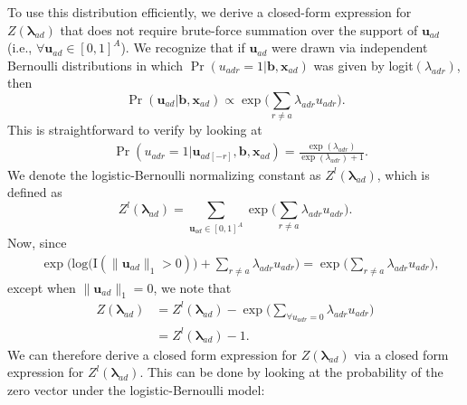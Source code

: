 \documentclass[ba]{imsart}
\numberwithin{equation}{section}
\theoremstyle{plain}
\begin{document}
	To use this distribution efficiently, we derive a closed-form expression for $Z(\boldsymbol{\lambda}_{ad})$ that does not require brute-force summation over the support of $\boldsymbol{u}_{ad}$ (i.e., $\forall \boldsymbol{u}_{ad} \in [0,1]^A$). We recognize that if $\boldsymbol{u}_{ad}$ were drawn via independent Bernoulli distributions in which $\Pr({u}_{adr}=1|\boldsymbol{b}, \boldsymbol{x}_{ad})$ was given by logit$(\lambda_{adr})$, then 
	\begin{equation*}
		\Pr(\boldsymbol{u}_{ad}|\boldsymbol{b}, \boldsymbol{x}_{ad}) \propto \exp\Big(\sum_{r \neq a } \lambda_{adr}u_{adr}\Big).  	 
	\end{equation*}
	This is straightforward to verify by looking at 
	\begin{equation*}
		\begin{aligned}
			&\Pr(u_{adr}=1|\boldsymbol{u}_{ad[-r]}, \boldsymbol{b}, \boldsymbol{x}_{ad})
			=\frac{\exp{(\lambda_{adr})}}{\exp{(\lambda_{adr})} + 1}.
		\end{aligned}\end{equation*}
		We denote the logistic-Bernoulli normalizing constant as $Z^{l}(\boldsymbol{\lambda}_{ad})$, which is defined as 
		\begin{equation*}
			Z^{l}( \boldsymbol{\lambda}_{ad})=\sum_{\boldsymbol{u}_{ad} \in [0,1]^{A}} \exp\Big(\sum_{r\neq a} \lambda_{adr}u_{adr}\Big).
		\end{equation*}
		Now, since 
		\begin{equation*}
			\begin{aligned}
				&\exp\Big(\mbox{log}\Big(\text{I}(\lVert \boldsymbol{u}_{ad} \rVert_1 > 0)\Big) + \sum_{r \neq a} \lambda_{adr}u_{adr} \Big)= \exp\Big( \sum_{r \neq a} \lambda_{adr}u_{adr} \Big),
			\end{aligned}
		\end{equation*}
		except when $\lVert \boldsymbol{u}_{ad} \rVert_1=0$, we note that 
		\begin{equation*}
			\begin{aligned}
				Z(\boldsymbol{\lambda}_{ad})& = Z^{l}(\boldsymbol{\lambda}_{ad}) -\exp\Big( \sum\limits_{\forall u_{adr}=0}\lambda_{adr}u_{adr} \Big)
				\\& = Z^{l}(\boldsymbol{\lambda}_{ad}) -  1.
			\end{aligned}
		\end{equation*}
		We can therefore derive a closed form expression for $Z(\boldsymbol{\lambda}_{ad})$ via a closed form expression for $Z^{l}(\boldsymbol{\lambda}_{ad})$. This can be done by looking at the probability of the zero vector under the logistic-Bernoulli model:
\end{document}
